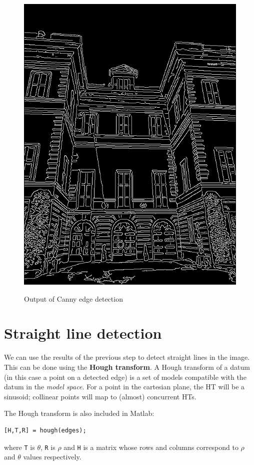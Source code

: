 \documentclass{Configuration_Files/PoliMi3i_thesis}
\begin{document}
\begin{figure}[H]
{        \includegraphics[scale=0.32]{output/F1_edges_50.PNG}
    }
    \caption[Output of Canny edge detection]{Output of Canny edge detection}
    \label{fig:quadtree2}
\end{figure}

\section{Straight line detection}
\label{section:f1:straight_line_detection}

We can use the results of the previous step to detect straight lines in the image. This can be done using the \textbf{Hough transform}. A Hough transform of a datum (in this case a point on a detected edge) is a set of models compatible with the datum in the \emph{model space}.
For a point in the cartesian plane, the HT will be a sinusoid; collinear points will map to (almost) concurrent HTs.

The Hough transform is also included in Matlab:
\begin{verbatim}
[H,T,R] = hough(edges);
\end{verbatim}
where \verb|T| is $\theta$, \verb|R| is $\rho$ and \verb|H| is a matrix whose rows and columns correspond to $\rho$ and $\theta$ values respectively.
\end{document}
